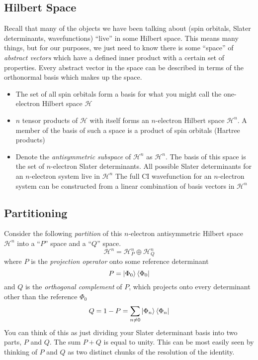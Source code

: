 \documentclass{article}
\begin{document}
\subsection{Hilbert Space}
Recall that many of the objects we have been talking about (spin orbitals, Slater determinants, wavefunctions)
``live'' in some Hilbert space. This means many things, but for our purposes, we just need to know
there is some ``space'' of \textit{abstract vectors} which have a defined inner product with a certain set of properties.
Every abstract vector in the space can be described in terms of the orthonormal basis which makes up the space. 

\begin{itemize}
\item The set of all spin orbitals form a basis for what you might call the one-electron Hilbert space $\mathcal{H}$
\item $n$ tensor products of $\mathcal{H}$ with itself forms an $n$-electron Hilbert space $\mathcal{H}^n$. 
        A member of the basis of such a space is a product of spin orbitals (Hartree products)
\item Denote the \textit{antisymmetric subspace} of $\mathcal{H}^n$ as $\mathscr{H}^n$. The basis of this space
    is the set of $n$-electron Slater determinants. All possible Slater determinants for an $n$-electron system live in $\mathscr{H}^n$ 
    The full CI wavefunction for an $n$-electron system can be constructed from a linear combination of basis vectors in $\mathscr{H}^n$
\end{itemize}

\subsection{Partitioning}
Consider the following \textit{partition} of this $n$-electron antisymmetric Hilbert space $\mathscr{H}^n$ into
a ``$P$'' space and a ``$Q$'' space.
\[ \mathscr{H}^n = \mathscr{H}^n_P \oplus  \mathscr{H}^n_Q \]
where $P$ is the \textit{projection operator} onto some reference determinant 
\[P = \ket{\Phi_0}\bra{\Phi_0}  \]
and $Q$ is the \textit{orthogonal complement} of $P$, which projects onto every determinant other than the reference $\Phi_0$
\[Q = 1 - P = \sum_{n \neq 0}  \ket{\Phi_n}\bra{\Phi_n} \]
You can think of this as just dividing your Slater determinant basis into two parts, $P$ and $Q$.
The sum $P + Q$ is equal to unity. This can be most easily seen by thinking of $P$ and $Q$ as two distinct chunks of the resolution of the identity. 
\end{document}
